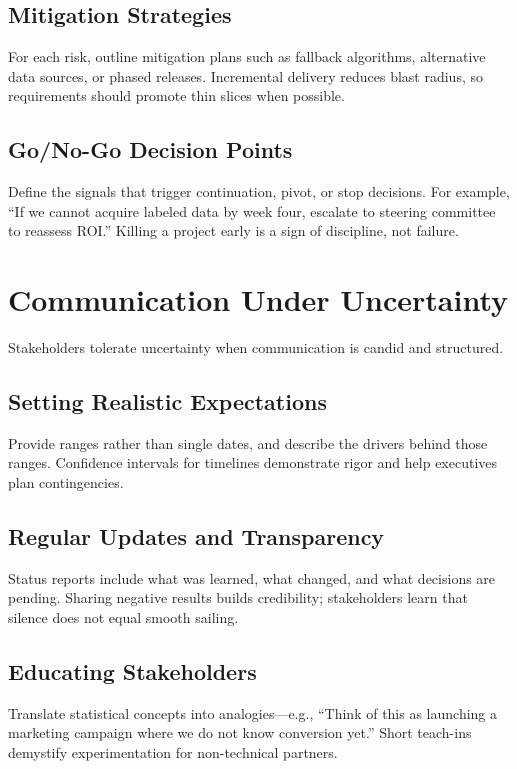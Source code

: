 \subsection{Mitigation Strategies}
For each risk, outline mitigation plans such as fallback algorithms, alternative data sources, or phased releases. Incremental delivery reduces blast radius, so requirements should promote thin slices when possible.

\subsection{Go/No-Go Decision Points}
Define the signals that trigger continuation, pivot, or stop decisions. For example, ``If we cannot acquire labeled data by week four, escalate to steering committee to reassess ROI.'' Killing a project early is a sign of discipline, not failure.

\section{Communication Under Uncertainty}
\label{sec:communication-uncertainty}

Stakeholders tolerate uncertainty when communication is candid and structured.

\subsection{Setting Realistic Expectations}
Provide ranges rather than single dates, and describe the drivers behind those ranges. Confidence intervals for timelines demonstrate rigor and help executives plan contingencies.

\subsection{Regular Updates and Transparency}
Status reports include what was learned, what changed, and what decisions are pending. Sharing negative results builds credibility; stakeholders learn that silence does not equal smooth sailing.

\subsection{Educating Stakeholders}
Translate statistical concepts into analogies—e.g., ``Think of this as launching a marketing campaign where we do not know conversion yet.'' Short teach-ins demystify experimentation for non-technical partners.


